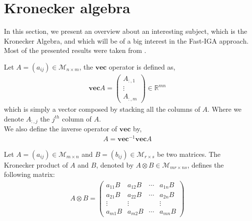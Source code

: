 \section{Kronecker algebra}
\label{sec:produit_kronecker_sec}
In this section, we present an overview about an interesting subject, which is the Kronecker Algebra, and which will be of a big interest in the Fast-IGA approach. Most of the presented results were taken from \cite{Graham_book,Bernstein_book}.

\begin{definition}
Let $A=(a_{ij}) \in \mathcal{M}_{n \times m}$, the $\mathbf{vec}$ operator is defined as,
\begin{align}
\mathbf{vec} A = \left(\begin{array}{c}
 A_{:,1}
\\
\vdots
\\
 A_{:,m}
\end{array}\right) \in \mathbb{R}^{mn}
\end{align}
which is simply a vector composed by stacking all the columns of $A$. Where we denote $ A_{:,j}$ the $j^{th}$ column of $A$.
\\
We also define the inverse operator of $\mathbf{vec}$ by,
\begin{align}
A = \mathbf{vec}^{-1} \mathbf{vec} A
\end{align}
\end{definition}

\begin{definition}
Let $A=(a_{ij}) \in \mathcal{M}_{m \times n}$ and $B=(b_{ij}) \in \mathcal{M}_{r \times s}$ be two matrices. The Kronecker product of $A$ and $B$, denoted by $A \otimes B  \in \mathcal{M}_{mr \times ns}$, defines the following matrix:
\begin{align}
A \otimes B = 
\left(\begin{array}{cccc}
a_{11}B & a_{12}B & \cdots & a_{1n}B 
\\
a_{21}B & a_{22}B & \cdots & a_{2n}B  
\\
\vdots & \vdots &  & \vdots 
\\
a_{m1}B & a_{m2}B & \cdots & a_{mn}B 
\end{array}\right)
\end{align}
\end{definition}

